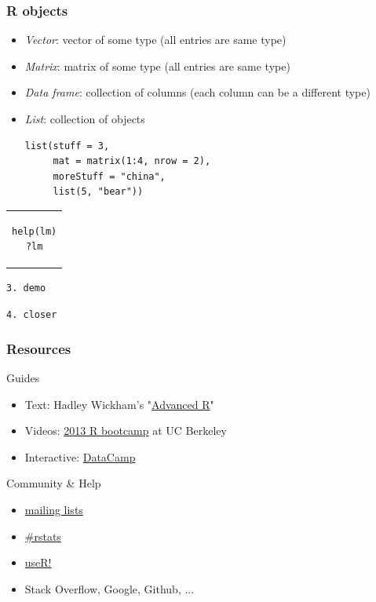 \documentclass[10pt,c]{beamer}
\begin{document}
\begin{frame}[fragile]
\frametitle{R objects}
\begin{itemize}
\item \emph{Vector}: vector of some type (all entries are same type)
\item \emph{Matrix}: matrix of some type (all entries are same type)
\item \emph{Data frame}: collection of columns (each column can be a different type)
\item \emph{List}: collection of objects
\begin{lstlisting}
list(stuff = 3,
     mat = matrix(1:4, nrow = 2),
     moreStuff = "china",
     list(5, "bear"))
\end{lstlisting}
\end{itemize}
\end{frame}
\begin{frame}
\vspace{1.5cm}
\begin{center}
\begin{tabular}{c}
\begin{lstlisting}
help(lm)
?lm
\end{lstlisting}
\end{tabular}
\end{center}
\end{frame}
\begin{frame}[plain]
\vspace{1.5cm}
\begin{center}
\Large\texttt{3. demo}
\end{center}
\end{frame}
\begin{frame}[plain]
\vspace{1.5cm}
\begin{center}
\Large\texttt{4. closer}
\end{center}
\end{frame}
\begin{frame}
\frametitle{Resources}
Guides
\begin{itemize}
\item Text: Hadley Wickham's "\href{http://adv-r.had.co.nz}{Advanced R}"
\item Videos: \href{https://www.youtube.com/watch?v=Bf6XQpyxLq0&list=UUGwuewhdHD2q0BvuB2oWMRw}{2013 R
bootcamp} at UC Berkeley
\item Interactive: \href{https://www.datacamp.com}{DataCamp}
\end{itemize}
\vspace{0.5cm}
Community \& Help
\begin{itemize}
\item \href{http://www.r-project.org/mail.html}{mailing lists}
\item \href{https://twitter.com/hashtag/rstats}{\#rstats}
\item \href{http://www.r-project.org/conferences.html}{useR!}
\item Stack Overflow, Google, Github, ...
\end{itemize}
\vspace{0.5cm}
\end{frame}
\end{document}
